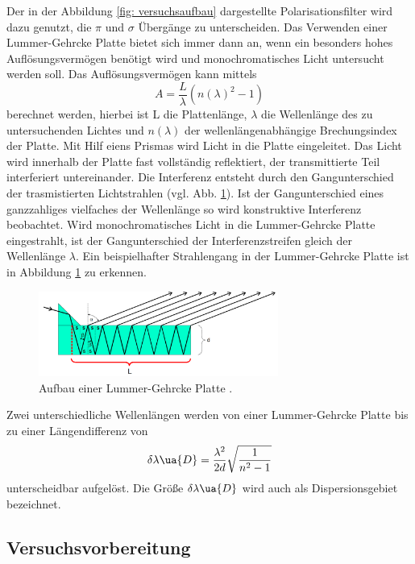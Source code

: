 Der in der Abbildung \ref{fig: versuchsaufbau} dargestellte Polarisationsfilter wird dazu genutzt, %
die $\pi$ und $\sigma$ Übergänge zu unterscheiden. Das Verwenden einer Lummer-Gehrcke Platte
bietet sich immer dann an, wenn ein besonders hohes Auflösungsvermögen benötigt wird
und monochromatisches Licht untersucht werden soll.
Das Auflösungsvermögen kann mittels
\begin{equation}
  \label{eq: auflösungsvermoegen_lummer}
  A=\frac{L}{\lambda}(n(\lambda)^2-1)
\end{equation}
berechnet werden, hierbei ist L die Plattenlänge, $\lambda$ die Wellenlänge
des zu untersuchenden Lichtes und $n(\lambda)$ der wellenlängenabhängige
Brechungsindex der Platte. Mit Hilf eiens Prismas wird Licht in die Platte eingeleitet. %
Das Licht wird innerhalb der Platte fast vollständig reflektiert, der transmittierte
Teil interferiert untereinander. Die Interferenz entsteht durch den Gangunterschied
der trasmistierten Lichtstrahlen (vgl. Abb. \ref{fig: lummer}). Ist der Gangunterschied
eines ganzzahliges vielfaches der Wellenlänge so wird konstruktive Interferenz beobachtet.
Wird monochromatisches Licht in die Lummer-Gehrcke Platte eingestrahlt, ist der
Gangunterschied der Interferenzstreifen gleich der Wellenlänge $\lambda$.
Ein beispielhafter Strahlengang in der Lummer-Gehrcke Platte ist in Abbildung \ref{fig: lummer} zu erkennen.
\FloatBarrier
\begin{figure}[h]
  \centering
  \includegraphics[width=0.7\textwidth]{pics/lummer.png}
  \caption{Aufbau einer Lummer-Gehrcke Platte \cite{anleitung27}.}
  \label{fig: lummer}
\end{figure}
\FloatBarrier
Zwei unterschiedliche Wellenlängen werden von einer Lummer-Gehrcke Platte bis zu
einer Längendifferenz von
\begin{equation}
  \label{eq: lummer_wellendif}
  \delta \lambda\ua{D}=\frac{\lambda^2}{2 d} \sqrt{\frac{1}{n^2-1}}
\end{equation}
unterscheidbar aufgelöst. Die Größe $\delta \lambda\ua{D}$ wird auch als Dispersionsgebiet
bezeichnet.

\subsection{Versuchsvorbereitung}

